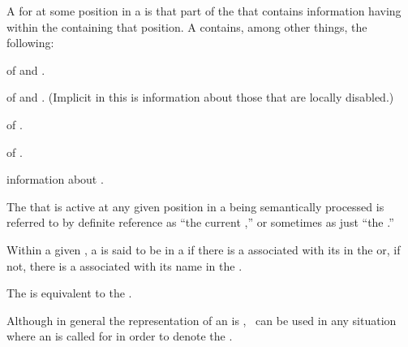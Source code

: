 A  for  at some position in a 
is that part of the  that contains information having 
 within the  containing that position.
A  contains, among other things, the following:

\beginlist
\item{\bull}  of  and .
\item{\bull}  of  and .
             (Implicit in this is information about those  
	      that are locally disabled.)
\item{\bull}  of .
\item{\bull}  of .
\item{\bull} information about .
\endlist

The  that is active at any given position
in a  being semantically processed is referred to by
definite reference as ``the current ,''
or sometimes as just ``the .''  

Within a given ,
a  is said to be  in a 
if there is a  
associated with its 
in the  or, if not, there is a  
associated with its name in the .


The  is equivalent to the .

Although in general the representation of an  
is , \nil\ can be used in any situation where an
  is called for in order to denote 
the .

\endsubsubsubsection%

